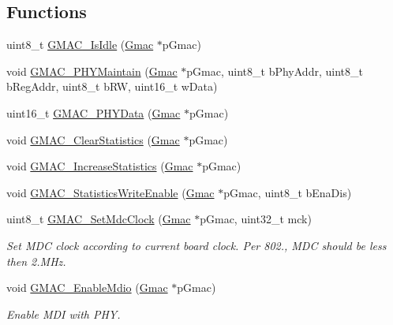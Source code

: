 \subsection*{Functions}
\begin{DoxyCompactItemize}
\item 
uint8\+\_\+t \mbox{\hyperlink{group__gmac__defines_gaa08d910a6f3f99c429158ad429368ffc}{G\+M\+A\+C\+\_\+\+Is\+Idle}} (\mbox{\hyperlink{structGmac}{Gmac}} $\ast$p\+Gmac)
\item 
void \mbox{\hyperlink{group__gmac__defines_ga6f6f590403bb6a1e27b19715fae19d20}{G\+M\+A\+C\+\_\+\+P\+H\+Y\+Maintain}} (\mbox{\hyperlink{structGmac}{Gmac}} $\ast$p\+Gmac, uint8\+\_\+t b\+Phy\+Addr, uint8\+\_\+t b\+Reg\+Addr, uint8\+\_\+t b\+RW, uint16\+\_\+t w\+Data)
\item 
uint16\+\_\+t \mbox{\hyperlink{group__gmac__defines_gac8f081caf9548311d6bd54ce1fca606d}{G\+M\+A\+C\+\_\+\+P\+H\+Y\+Data}} (\mbox{\hyperlink{structGmac}{Gmac}} $\ast$p\+Gmac)
\item 
void \mbox{\hyperlink{group__gmac__defines_ga9ae76d6d8ceef0dafbe72bb34864bc65}{G\+M\+A\+C\+\_\+\+Clear\+Statistics}} (\mbox{\hyperlink{structGmac}{Gmac}} $\ast$p\+Gmac)
\item 
void \mbox{\hyperlink{group__gmac__defines_gac179a7fa9d7e3dcabf9a88f996ec0a80}{G\+M\+A\+C\+\_\+\+Increase\+Statistics}} (\mbox{\hyperlink{structGmac}{Gmac}} $\ast$p\+Gmac)
\item 
void \mbox{\hyperlink{group__gmac__defines_gaf6fe272b7c94b53548c728c9b336cc5e}{G\+M\+A\+C\+\_\+\+Statistics\+Write\+Enable}} (\mbox{\hyperlink{structGmac}{Gmac}} $\ast$p\+Gmac, uint8\+\_\+t b\+Ena\+Dis)
\item 
uint8\+\_\+t \mbox{\hyperlink{group__gmac__defines_ga56d0b7353ef8be740202f6e5a902ca6a}{G\+M\+A\+C\+\_\+\+Set\+Mdc\+Clock}} (\mbox{\hyperlink{structGmac}{Gmac}} $\ast$p\+Gmac, uint32\+\_\+t mck)
\begin{DoxyCompactList}\small\item\em Set M\+DC clock according to current board clock. Per 802., M\+DC should be less then 2.\+M\+Hz. \end{DoxyCompactList}\item 
void \mbox{\hyperlink{group__gmac__defines_gabf89fc2e0cb8e9ec7e0b99a5a14cae50}{G\+M\+A\+C\+\_\+\+Enable\+Mdio}} (\mbox{\hyperlink{structGmac}{Gmac}} $\ast$p\+Gmac)
\begin{DoxyCompactList}\small\item\em Enable M\+DI with P\+HY. \end{DoxyCompactList}\item 

\end{DoxyCompactItemize}
